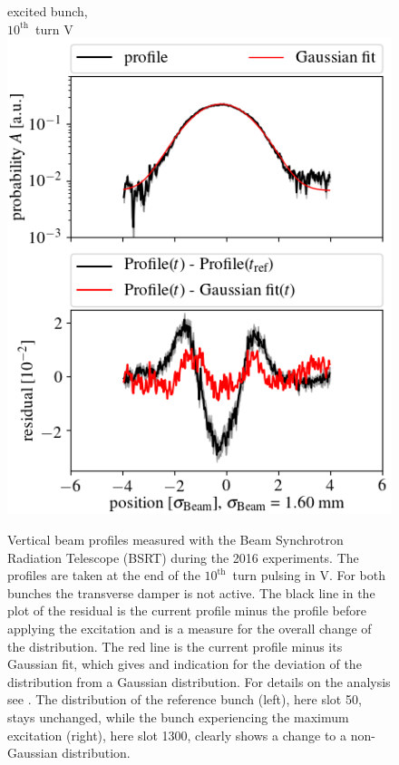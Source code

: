 \documentclass[%
 reprint,
 amsmath,amssymb,
 aps,
prstab,
]{revtex4-1}
\begin{document}
\begin{figure}[h]
\begin{minipage}[t]{0.49\linewidth}
		excited bunch,\\ $10^{\mathrm{th}}$~turn V		\includegraphics[width=1.0\linewidth]{profile_v_10thv_slot_1300.png}
	\end{minipage}
	\caption{\label{fig:10thexpprof} Vertical beam profiles measured with the Beam Synchrotron Radiation Telescope (BSRT) during the 2016 experiments. The profiles are taken at the end of the $10^{\mathrm{th}}$~turn pulsing in V. For both bunches the transverse damper is not active. The black line in the plot of the residual is the current profile minus the profile before applying the excitation and is a measure for the overall change of the distribution. The red line is the current profile minus its Gaussian fit, which gives and indication for the deviation of the distribution from a Gaussian distribution. For details on the analysis see \cite{bsrtprofinj}. The distribution of the reference bunch (left), here slot 50, stays unchanged, while the bunch experiencing the maximum excitation (right), here slot 1300, clearly shows a change to a non-Gaussian distribution.}
\end{figure}
\end{document}
